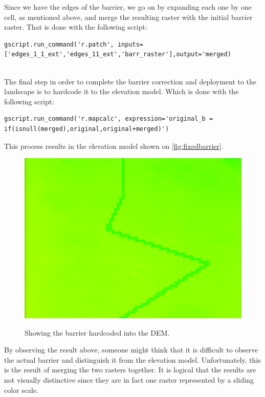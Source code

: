 Since we have the edges of the barrier, we go on by expanding each one by one cell, as mentioned above, and merge the resulting raster with the initial barrier raster. That is done with the following script:\\

\begin{lstlisting}
gscript.run_command('r.patch', inputs=['edges_1_1_ext','edges_11_ext','barr_raster'],output='merged)
\end{lstlisting}\\

The final step in order to complete the barrier correction and deployment to the landscape is to hardcode it to the elevation model. Which is done with the following script: \\

\begin{lstlisting}
gscript.run_command('r.mapcalc', expression='original_b = if(isnull(merged),original,original+merged)')
\end{lstlisting}

This process results in the elevation model shown on \autoref{fig:fixedbarrier}.

\begin{figure}[h!]
\centering
	{\includegraphics[width=0.75\linewidth]{gfx/Phase_4/Barrier5.png}}
\caption{Showing the barrier hardcoded into the DEM.}
\label{fig:fixedbarrier}
\end{figure}

By observing the result above, someone might think that it is difficult to observe the actual barrier and distinguish it from the elevation model. Unfortunately, this is the result of merging the two rasters together. It is logical that the results are not visually distinctive since they are in fact one raster represented by a sliding color scale.

